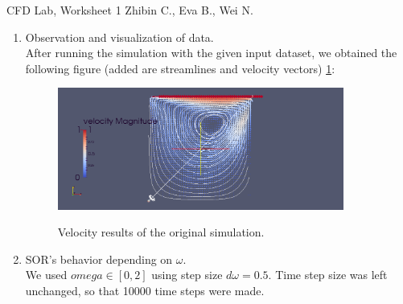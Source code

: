 \documentclass[a4paper]{article}
\begin{document}
\begin{center}
{\LARGE CFD Lab, Worksheet 1} \newline
{\small Zhibin C., Eva B., Wei N.\\}
\end{center}
\begin{enumerate}
\item Observation and visualization of data.\\
After running the simulation with the given input dataset, we obtained the following figure (added are streamlines and velocity vectors) \ref{orig}:

\begin{figure}[h!!]
\centering
\includegraphics[height= 4cm]{original_simulation.png}
\label{orig}
\caption{Velocity results of the original simulation.}
\end{figure}


\item SOR's behavior depending on $\omega$.\\
We used $omega \in [0, 2]$ using step size $d\omega=0.5$.
Time step size was left unchanged, so that 10000 time steps were made.


\end{enumerate}
\end{document}
